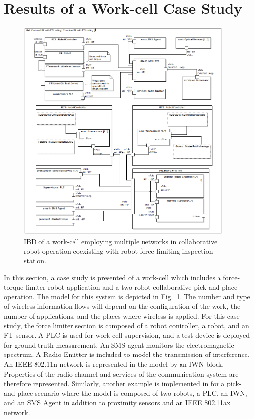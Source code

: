 \section{Results of a Work-cell Case Study}\label{sysml:sec:wireless-infoflows}
\begin{figure}[tbp]
	\centering
	\includegraphics[width=0.95\textwidth]{./chapter-sysml/diagrams/ibd__Combined_PP_with_FT_Limiting__Combined_PP_with_FT_Limiting}
	\caption{IBD of a work-cell employing multiple networks in collaborative robot operation coexisting with robot force limiting inspection station.}
	\label{sysml:fig:workcell:examples}     
\end{figure}

In this section, a case study is presented of a work-cell which includes a force-torque limiter robot application and a two-robot collaborative pick and place operation.  The model for this system is depicted in Fig.~\ref{sysml:fig:workcell:examples}.  The number and type of wireless information flows will depend on the configuration of the work, the number of applications, and the places where wireless is applied. For this case study, the force limiter section is composed of a robot controller, a robot, and an FT sensor. A PLC is used for work-cell supervision, and a test device is deployed for ground truth measurement.  An SMS agent monitors the electromagnetic spectrum.  A Radio Emitter is included to model the transmission of interference.  An IEEE 802.11n network is represented in the model by an IWN block. Properties of the radio channel and services of the communication system are therefore represented. Similarly, another example is implemented in \cite{Candell2018SysML.GitHub} for a pick-and-place scenario where the model is composed of two robots, a PLC, an IWN, and an SMS Agent in addition to proximity sensors and an IEEE 802.11ax network.

